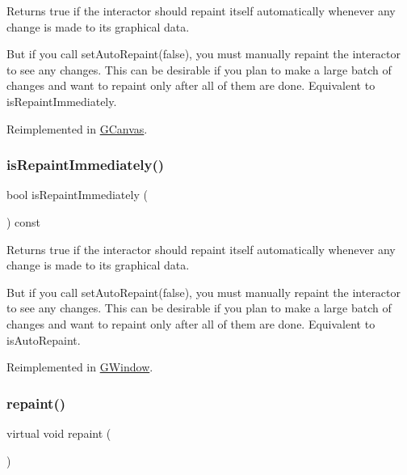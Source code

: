 Returns true if the interactor should repaint itself automatically whenever any change is made to its graphical data. 

But if you call set\+Auto\+Repaint(false), you must manually repaint the interactor to see any changes. This can be desirable if you plan to make a large batch of changes and want to repaint only after all of them are done. Equivalent to is\+Repaint\+Immediately. 

Reimplemented in \mbox{\hyperlink{classsgl_1_1GCanvas_a189881032e2b355095790b83b2454d8d}{G\+Canvas}}.

\mbox{\label{classsgl_1_1GDrawingSurface_a82a00267c81cc0ae85ee0feb01a92fa8}} 
\subsubsection{\texorpdfstring{is\+Repaint\+Immediately()}{isRepaintImmediately()}}
{\footnotesize\ttfamily bool is\+Repaint\+Immediately (\begin{DoxyParamCaption}{ }\end{DoxyParamCaption}) const\hspace{0.3cm}{\ttfamily [virtual]}}



Returns true if the interactor should repaint itself automatically whenever any change is made to its graphical data. 

But if you call set\+Auto\+Repaint(false), you must manually repaint the interactor to see any changes. This can be desirable if you plan to make a large batch of changes and want to repaint only after all of them are done. Equivalent to is\+Auto\+Repaint. 

Reimplemented in \mbox{\hyperlink{classsgl_1_1GWindow_a45b1955433b8bf8a449a216b847d87f7}{G\+Window}}.

\mbox{\label{classsgl_1_1GDrawingSurface_a4a8ae47b42f1e6a41b65d3546df46218}} 
\subsubsection{\texorpdfstring{repaint()}{repaint()}}
{\footnotesize\ttfamily virtual void repaint (\begin{DoxyParamCaption}{ }\end{DoxyParamCaption})\hspace{0.3cm}{\ttfamily [pure virtual]}}



